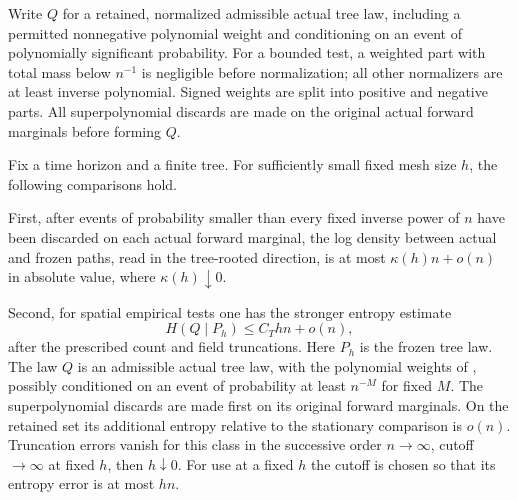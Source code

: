 Write $Q$ for a retained, normalized admissible actual tree law,
including a permitted nonnegative polynomial weight and conditioning
on an event of polynomially significant probability.  For a bounded
test, a weighted part with total mass below $n^{-1}$ is negligible
before normalization; all other normalizers are at least inverse
polynomial.  Signed weights are split into positive and negative
parts.  All superpolynomial discards are made on the original actual
forward marginals before forming $Q$.

\begin{lemma}
\label{lem:path-two-mesh}
Fix a time horizon and a finite tree.  For sufficiently small fixed
mesh size $h$, the following comparisons hold.

First, after events of probability smaller than every fixed inverse
power of $n$ have been discarded on each actual forward marginal, the
log density between actual and frozen paths, read in the tree-rooted
direction, is at most $\kappa(h)n+o(n)$ in absolute value, where
$\kappa(h)\downarrow0$.

Second, for spatial empirical tests one has the stronger entropy
estimate
\begin{equation}
 H(Q\mid P_h)\le C_T hn+o(n),
 \label{eq:path-mesh-entropy}
\end{equation}
after the prescribed count and field truncations.  Here $P_h$ is the frozen tree law.  The law $Q$ is an admissible actual
tree law, with the polynomial weights of , possibly
conditioned on an event of probability at least $n^{-M}$ for fixed $M$.
The superpolynomial discards are made first on its original forward
marginals.  On the retained set its additional entropy relative to the
stationary comparison is $o(n)$.  Truncation errors vanish for this
class in the successive order $n\to\infty$, cutoff $\to\infty$ at
fixed $h$, then $h\downarrow0$.
For use at a fixed $h$ the cutoff is chosen so that its entropy error
is at most $hn$.
\end{lemma}

